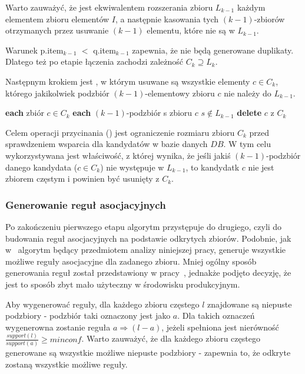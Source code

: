 Warto zauważyć, że  jest ekwiwalentem rozszerania zbioru $L_{k-1}$ każdym elementem zbioru elementów $I$, a następnie kasowania tych $(k-1)$-zbiorów otrzymanych przez usuwanie $(k-1)$ elementu, które nie są w $L_{k-1}$. 

Warunek p.item$_{k-1}$ $<$ q.item$_{k-1}$ zapewnia, że nie będą generowane duplikaty. Dlatego też po etapie łączenia zachodzi zależność $C_k \supseteq L_k$.

Następnym krokiem jest , w którym usuwane są wszystkie elementy $c \in C_k$, którego jakikolwiek podzbiór $(k-1)$-elementowy zbioru $c$ nie należy do $L_{k-1}$.

\begin{codebox}
		\li \For \textbf{each} zbiór $c \in C_k$ 
		\li \Do
			\li \For \textbf{each} $(k-1)$-podzbiór s zbioru $c$
					\li \Do 
						\If $s \notin L_{k-1}$
						\li \Then
							\textbf{delete} $c$ z $C_k$
						\End
					\End
		\End
\end{codebox}

Celem operacji przycinania () jest ograniczenie rozmiaru zbioru $C_k$ przed sprawdzeniem wsparcia dla kandydatów w bazie danych $DB$. W tym celu wykorzystywana jest właściwość, z której wynika, że jeśli jakiś $(k-1)$-podzbiór danego kandydata ($c \in C_k$) nie występuje w $L_{k-1}$, to kandydatk $c$ nie jest zbiorem częstym i powinien być usunięty z $C_k$.

\subsubsection{Generowanie reguł asocjacyjnych}
Po zakończeniu pierwszego etapu algorytm przystępuje do drugiego, czyli do budowania reguł asocjacyjnych na podstawie odkrytych zbiorów. Podobnie, jak w~\cite{Apriori:Main} algorytm będący przedmiotem analizy niniejszej pracy, generuje wszystkie możliwe reguły asocjacyjne dla zadanego zbioru. Mniej ogólny sposób generowania reguł został przedstawiony w pracy~\cite{Problem:Statement}, jednakże podjęto decyzję, że jest to sposób zbyt mało użyteczny w środowisku produkcyjnym.

Aby wygenerować reguły, dla każdego zbioru częstego $l$ znajdowane są niepuste podzbiory - podzbiór taki oznaczony jest jako $a$. Dla takich oznaczeń wygenerowna zostanie reguła $a \Rightarrow (l-a)$, jeżeli spełniona jest nierówność $\frac{support(l)}{support(a)} \geq minconf$. Warto zauważyć, że dla każdego zbioru częstego generowane są wszystkie możliwe niepuste podzbiory - zapewnia to, że odkryte zostaną wszystkie możliwe reguły.


